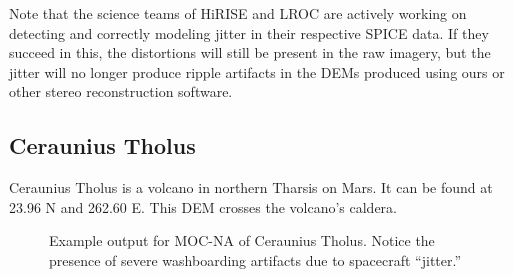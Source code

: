 Note that the science teams of \ac{HiRISE} and \ac{LROC} are actively
working on detecting and correctly modeling jitter in their respective
SPICE data. If they succeed in this, the distortions will still
be present in the raw imagery, but the jitter will no longer produce
ripple artifacts in the DEMs produced using ours or other stereo
reconstruction software.

\subsection{Ceraunius Tholus}


Ceraunius Tholus is a volcano in northern Tharsis on Mars. It can
be found at 23.96 N and 262.60 E. This \ac{DEM} crosses the volcano's
caldera.

\begin{figure}[h]
\centering
  \hfil
\caption{Example output for MOC-NA of Ceraunius Tholus. Notice the presence of severe washboarding artifacts due to spacecraft ``jitter.''}
\label{fig:mocna_ceraunius_example}
\end{figure}

